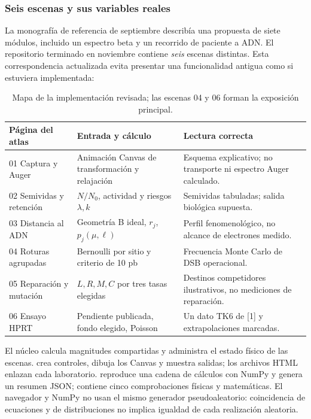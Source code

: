 \subsubsection{Seis escenas y sus variables reales}
La monografía de referencia de septiembre describía una propuesta de siete
módulos, incluido un espectro beta y un recorrido de paciente a ADN. El
repositorio terminado en noviembre contiene \emph{seis} escenas distintas.
Esta correspondencia actualizada evita presentar una funcionalidad antigua
como si estuviera implementada:
\begin{table}[htbp]\centering\footnotesize
\begin{tabularx}{\linewidth}{@{}p{.19\linewidth}p{.35\linewidth}X@{}}
\toprule Página del atlas & Entrada y cálculo & Lectura correcta \\\midrule
01 Captura y Auger & Animación Canvas de transformación y relajación & Esquema explicativo; no transporte ni espectro Auger calculado. \\
02 Semividas y retención & $N/N_0$, actividad y riesgos $\lambda,k$ & Semividas tabuladas; salida biológica supuesta. \\
03 Distancia al ADN & Geometría B ideal, $r_j$, $p_j(\mu,\ell)$ & Perfil fenomenológico, no alcance de electrones medido. \\
04 Roturas agrupadas & Bernoulli por sitio y criterio de 10 pb & Frecuencia Monte Carlo de DSB operacional. \\
05 Reparación y mutación & $L,R,M,C$ por tres tasas elegidas & Destinos competidores ilustrativos, no mediciones de reparación. \\
06 Ensayo HPRT & Pendiente publicada, fondo elegido, Poisson & Un dato TK6 de [1] y extrapolaciones marcadas. \\\bottomrule
\end{tabularx}
\caption{Mapa de la implementación revisada; las escenas 04 y 06 forman la exposición principal.}
\end{table}

El núcleo  calcula magnitudes compartidas y administra
el estado físico de las escenas.  crea controles, dibuja los
Canvas y muestra salidas; los archivos HTML enlazan cada laboratorio.
 reproduce una cadena de cálculos con NumPy y
genera un resumen JSON;  contiene cinco
comprobaciones físicas y matemáticas. El navegador y NumPy no usan el
mismo generador pseudoaleatorio: coincidencia de ecuaciones y de
distribuciones no implica igualdad de cada realización aleatoria.

